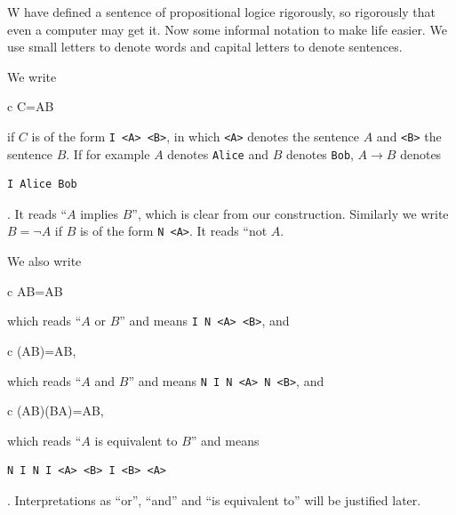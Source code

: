\documentclass[11pt,oneside,%
]{memoir}
\newenvironment{eqna}{\begin{IEEEeqnarray}{c}}{\end{IEEEeqnarray}\ignorespacesafterend}
\theoremstyle{definition}
\begin{document}
%
%

W have defined a sentence of propositional logice rigorously, so rigorously that even a computer may get it. Now some informal notation to make life easier. We use small letters to denote words and capital letters to denote sentences.

We write
\begin{eqna}
    C=A\rightarrow B
\end{eqna}
if \(C\) is of the form \lstinline[language=propositio]!I <A> <B>!, in which \lstinline[language=propositio]!<A>! denotes the sentence \(A\) and \lstinline[language=propositio]!<B>! the sentence \(B\). If for example \(A\) denotes \lstinline[language=propositio]!Alice! and \(B\) denotes \lstinline[language=propositio]!Bob!, \(A\rightarrow B\) denotes
\begin{lstlisting}[language=propositio]
I Alice Bob
\end{lstlisting}
. It reads ``\(A\) implies \(B\)'', which is clear from our construction. Similarly we write \(B=\neg A\) if \(B\) is of the form \lstinline[language=propositio]!N <A>!. It reads ``not \(A\).

We also write
\begin{eqna}
    \neg A\rightarrow B=A\vee B
\end{eqna}
which reads ``\(A\) or \(B\)'' and means \lstinline[language=propositio]!I N <A> <B>!, and
\begin{eqna}
    \neg(\neg A\vee\neg B)=A\wedge B,
\end{eqna}
which reads ``\(A\) and \(B\)'' and means \lstinline[language=propositio]!N I N <A> N <B>!, and
\begin{eqna}
    (A\rightarrow B)\wedge(B\rightarrow A)=A\leftrightarrow B,
\end{eqna}
which reads ``\(A\) is equivalent to \(B\)'' and means
\begin{lstlisting}[language=propositio]
N I N I <A> <B> I <B> <A>
\end{lstlisting}
. Interpretations as ``or'', ``and'' and ``is equivalent to'' will be justified later.
\end{document}
